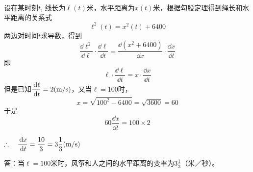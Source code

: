 \begin{solution}
    设在某时刻$t$, 线长为$\ell(t)$米，水平距离为$x(t)$米，根据勾股定理得到绳长和水平距离的关系式
\[\ell^2 (t) =x^2 (t) +6400\]
两边对时间$t$求导数，得到
\[\frac{\dd \ell^2}{\dd \ell}\cdot \frac{\dd \ell}{\dd t}=\frac{\dd(x^2+6400)}{\dd x}\cdot \frac{\dd x}{\dd t}\]
即
\[\ell\cdot \frac{\dd \ell}{\dd t}=x\cdot \frac{\dd x}{\dd t}\]
但是已知$\dfrac{\,{\rm d}\ell}{\,{\rm d} t}=2({\rm m/s})$，又当$\ell=100$时，
\[x=\sqrt{100^2-6400}=\sqrt{3600}=60\]
于是
\[60\frac{\dd x}{\dd t}=100\times 2\]

$\therefore\quad \dfrac{\,{\rm d} x}{\,{\rm d} t}=\dfrac{10}{3}=3\dfrac{1}{3}({\rm m/s})$

答：当$\ell=100$米时，风筝和人之间的水平距离的变率为$3\frac{1}{3}$（米／秒）。
\end{solution}

